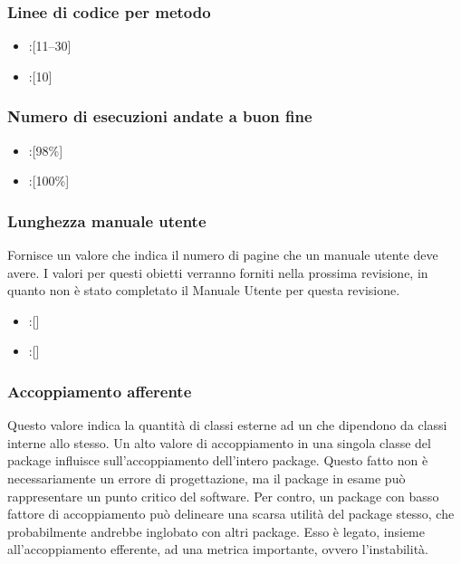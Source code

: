 \subsubsection{Linee di codice per metodo}
\begin{itemize}
\item {}:[11--30]
\item {}:[10]
\end{itemize}

\subsubsection{Numero di esecuzioni andate a buon fine}
\begin{itemize}
\item {}:[98\%]
\item {}:[100\%]
\end{itemize}

\subsubsection{Lunghezza manuale utente}
Fornisce un valore che indica il numero di pagine che un manuale utente deve avere. I valori per questi obietti verranno forniti nella prossima revisione, in quanto non è stato completato il Manuale Utente per questa revisione.
\begin{itemize}
\item {}:[]
\item {}:[]
\end{itemize}

\subsubsection{Accoppiamento afferente}
Questo valore indica la quantità di classi esterne ad un  che dipendono da classi interne allo stesso.
Un alto valore di accoppiamento in una singola classe del package influisce sull'accoppiamento dell'intero package. Questo fatto non è necessariamente un errore di progettazione, ma il package in esame può rappresentare un punto critico del software. Per contro, un package con basso fattore di accoppiamento può delineare una scarsa utilità del package stesso, che probabilmente andrebbe inglobato con altri package. Esso è legato, insieme all'accoppiamento efferente, ad una metrica importante, ovvero l'instabilità.

